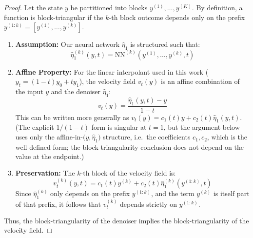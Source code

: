 \begin{proof}
Let the state $y$ be partitioned into blocks $y^{(1)}, \dots, y^{(K)}$. By definition, a function is block-triangular if the $k$-th block outcome depends only on the prefix $y^{(1:k)} = [y^{(1)}, \dots, y^{(k)}]$.

\begin{enumerate}
    \item \textbf{Assumption:} Our neural network $\hat{\eta}_1$ is structured such that:
    \begin{equation}
        \hat{\eta}_1^{(k)}(y, t) = \text{NN}^{(k)}(y^{(1)}, \dots, y^{(k)}, t)
    \end{equation}

    \item \textbf{Affine Property:} For the linear interpolant used in this work ($y_t = (1-t)y_0 + ty_1$), the velocity field $v_t(y)$ is an affine combination of the input $y$ and the denoiser $\hat{\eta}_1$:
    \begin{equation}
        v_t(y) = \frac{\hat{\eta}_1(y, t) - y}{1 - t}
    \end{equation}
    This can be written more generally as $v_t(y) = c_1(t)y + c_2(t)\hat{\eta}_1(y, t)$. (The explicit $1/(1-t)$ form is singular at $t=1$, but the argument below uses only the affine-in-$\bigl(y,\hat{\eta}_1\bigr)$ structure, i.e.\ the coefficients $c_1, c_2$, which is the well-defined form; the block-triangularity conclusion does not depend on the value at the endpoint.)

    \item \textbf{Preservation:} The $k$-th block of the velocity field is:
    \begin{equation}
        v_t^{(k)}(y, t) = c_1(t)y^{(k)} + c_2(t)\hat{\eta}_1^{(k)}(y^{(1:k)}, t)
    \end{equation}
    Since $\hat{\eta}_1^{(k)}$ only depends on the prefix $y^{(1:k)}$, and the term $y^{(k)}$ is itself part of that prefix, it follows that $v_t^{(k)}$ depends strictly on $y^{(1:k)}$.
\end{enumerate}

Thus, the block-triangularity of the denoiser implies the block-triangularity of the velocity field. 
\end{proof}
